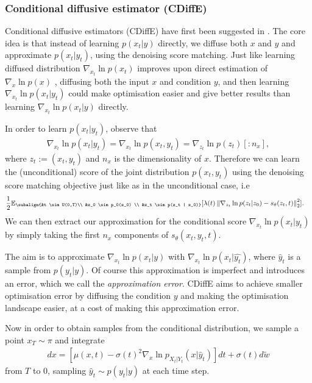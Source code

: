 \subsubsection{Conditional diffusive estimator (CDiffE)}
\label{ch2:sec:CDiffE}
Conditional diffusive estimators (CDiffE) have first been suggested in \cite{song2021sde}. The core idea is that instead of learning $p(x_t | y)$ directly, we diffuse both $x$ and $y$ and approximate $p(x_t | y_t)$, using the denoising score matching. Just like learning diffused distribution $\nabla_{x_t} \ln p(x_t)$ improves upon direct estimation of $\nabla_{x} \ln p(x)$ \cite{song2020generative_score, song2021sde}, diffusing both the input $x$ and condition $y$, and then learning $\nabla_{x_t} \ln p(x_t | y_t)$ could make optimisation easier and give better results than learning  $\nabla_{x_t} \ln p(x_t | y)$ directly.
    
In order to learn $p(x_t | y_t)$, observe that
\begin{gather*}
    \nabla_{x_t}\ln p(x_t | y_t) = \nabla_{x_t}\ln p(x_t, y_t) = \nabla_{z_t}\ln p(z_t)[:n_x],
\end{gather*}
where $z_t := (x_t, y_t)$ and $n_x$ is the dimensionality of $x$. Therefore we can learn the (unconditional) score of the joint distribution $p(x_t, y_t)$ using the denoising score matching objective just like as in the unconditional case, i.e
\begin{gather}
    \label{ch2:CDF}
\begin{aligned}
    &\frac{1}{2} \mathbb{E}_{\subalign{&t \sim U(0,T)\\ &z_0 \sim p_0(z_0) \\ &z_t \sim p(z_t | z_0)}} [\lambda(t) \norm{\nabla_{z_t} \ln{p(z_t |z_0)} - s_\theta(z_t,t)}_2^2].
\end{aligned}
\end{gather}
We can then extract our approximation for the conditional score $\nabla_{x_t} \ln p(x_t|y_t)$ by simply taking the first $n_x$ components of $s_\theta(x_t, y_t,t)$.

The aim is to approximate $\nabla_{x_t} \ln p(x_t | y)$ with $\nabla_{x_t} \ln p(x_t|\hat{y_t})$, where $\hat{y}_t$ is a sample from $p(y_t | y)$. Of course this approximation is imperfect and introduces an error, which we call the \textit{approximation error}. CDiffE aims to achieve smaller optimisation error by diffusing the condition $y$ and making the optimisation landscape easier, at a cost of making this approximation error.

Now in order to obtain samples from the conditional distribution, we sample a point $x_T \sim \pi$ and integrate
\begin{gather*}
    dx = [\mu(x,t) - \sigma(t)^2 \nabla_{x} \ln p_{X_t|Y_t}(x | \hat{y}_t)]dt + \sigma(t)d\tilde{w}
\end{gather*}
from $T$ to $0$, sampling $\hat{y}_t \sim p(y_t | y)$ at each time step.

